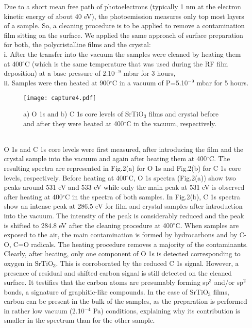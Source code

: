 \documentclass{aip-cp}
\begin{document}
Due to a short mean free path of photoelectrons (typically 1 nm at the electron kinetic energy of about 40 eV), the photoemission measures only top most layers of a sample. So, a cleaning procedure is to be applied to remove a contamination film sitting on the surface. We applied the same approach of surface preparation for both, the polycristalline films and the crystal: 
\\i. After the transfer into the vacuum the samples were cleaned by heating them at 400$^{\circ}$C (which is the same temperature that was used during the RF film deposition) at a base pressure of 2.10$^{-9}$ mbar for 3 hours, 
\\ii. Samples were then heated at 900$^{\circ}$C in a vacuum of P=5.10$^{-9}$ mbar for 5 hours.
\begin{figure}[h!]
	\centerline{\texttt{[image: capture4.pdf]}}
		\caption{a) O 1s and b) C 1s core levels of SrTiO$_{3}$ films and crystal before and after they were heated at 400$^{\circ}$C in the vacuum, respectively.}
\end{figure}
\\O 1s and C 1s core levels were first measured, after introducing the film and the crystal sample into the vacuum and again after heating them at 400$^{\circ}$C. The resulting spectra are represented in Fig.2(a) for O 1s and Fig.2(b) for C 1s core levels, respectively. Before heating at 400$^{\circ}$C, O 1s spectra (Fig.2(a)) show two peaks around 531 eV and 533 eV while only the main peak at 531 eV is observed after heating at 400$^{\circ}$C in the spectra of both samples. In Fig.2(b), C 1s spectra show an intense peak at 286.5 eV for film and crystal samples after introduction into the vacuum. The intensity of the peak is considerably reduced and the peak is shifted to 284.8 eV after the cleaning procedure at 400$^{\circ}$C. When samples are exposed to the air, the main contamination is formed by hydrocarbons and by C-O, C=O radicals. The heating procedure removes a majority of the contaminants. Clearly, after heating, only one component of O 1s is detected corresponding to oxygen in SrTiO$_{3}$. This is corroborated by the reduced C 1s signal. However, a presence of residual and shifted carbon signal is still detected on the cleaned surface. It testifies that the carbon atoms are presumably forming sp$^{3}$ and/or sp$^{2}$ bonds, a signature of graphitic-like compounds. In the case of SrTiO$_{3}$ films, carbon can be present in the bulk of the samples, as the preparation is performed in rather low vacuum (2.10$^{-4}$ Pa) conditions, explaining why its contribution is smaller in the spectrum than for the other sample.
\end{document}
